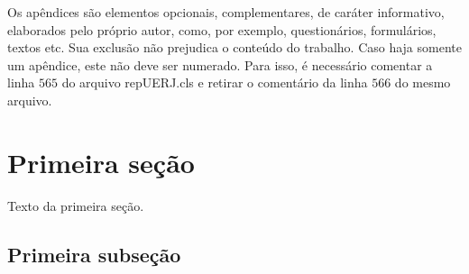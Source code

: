 
\backmatter %




% 
% 




\appendix %


Os apêndices são elementos opcionais, complementares, de caráter informativo, elaborados pelo próprio autor, como, por exemplo, questionários, formulários, textos etc. Sua exclusão não prejudica o conteúdo do trabalho. Caso haja somente um apêndice, este não deve ser numerado. Para isso, é necessário comentar a linha $565$ do arquivo repUERJ.cls e retirar o comentário da linha $566$ do mesmo arquivo.

\section{Primeira seção}

Texto da primeira seção.

\subsection{Primeira subseção}

